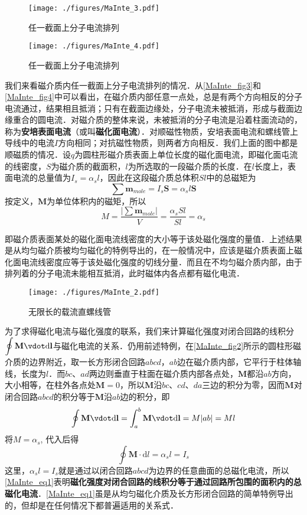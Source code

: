 \begin{figure}[ht]
\centering
\texttt{[image: ./figures/MaInte\_3.pdf]}
\caption{任一截面上分子电流排列} \label{MaInte_fig3}
\end{figure}
\begin{figure}[ht]
\centering
\texttt{[image: ./figures/MaInte\_4.pdf]}
\caption{任一截面上分子电流排列} \label{MaInte_fig4}
\end{figure}
我们来看磁介质内任一截面上分子电流排列的情况．从\autoref{MaInte_fig3}和\autoref{MaInte_fig4}中可以看出，在磁介质内部任意一点处，总是有两个方向相反的分子电流通过，结果相且抵消；只有在截面边缘处，分子电流未被抵消，形成与截面边缘重合的圆电流．对磁介质的整体来说，未被抵消的分子电流是沿着柱面流动的，称为\textbf{安培表面电流}（或叫\textbf{磁化面电流}）．对顺磁性物质，安培表面电流和螺线管上导线中的电流$I$方向相同；对抗磁性物质，则两者方向相反．我们上面的图中都是顺磁质的情况．设$q $为圆柱形磁介质表面上单位长度的磁化面电流，即磁化面屯流的线密度，$ S $为磁介质的截面积，$ l $为所选取的一段磁介质的长度．在$l $长度上，表面电流的总量值为$I_s=\alpha_sl$，因此在这段磁介质总体积$Sl$中的总磁矩为
\begin{equation}
\sum \mathbf{m}_{mole}=I_{s} \mathbf S=\alpha_{s} l \mathbf S
\end{equation}
按定义，$\mathbf  M $为单位体积内的磁矩，所以
\begin{equation}
M=\frac{\left|\sum \mathbf  m_{mole}\right|}{V}=\frac{\alpha_{s} S l}{S l}=\alpha_s
\end{equation}

即磁介质表面某处的磁化面电流线密度的大小等于该处磁化强度的量值．上述结果是从均匀磁介质被均匀磁化的特例导出的，在一般情况中，应该是磁介质表面上磁化面电流线密度应等于该处磁化强度的切线分量．而且在不均匀磁介质内部，由于排列着的分子电流未能相互抵消，此时磁体内各点都有磁化电流．

\begin{figure}[ht]
\centering
\texttt{[image: ./figures/MaInte\_2.pdf]}
\caption{无限长的载流直螺线管} \label{MaInte_fig2}
\end{figure}
为了求得磁化电流与磁化强度的联系，我们来计算磁化强度对闭合回路的线积分$\displaystyle \oint \mathbf M \vdot \mathrm{d} \mathbf l$与磁化电流的关系．仍用前述特例，在\autoref{MaInte_fig2}所示的圆柱形磁介质的边界附近，取一长方形闭合回路$abcd$，$ab $边在磁介质内部，它平行于柱体轴线，长度为$l$．而$bc$、$ad $两边则垂直于柱面在磁介质内部各点处，$\mathbf M$都沿$ab $方向，大小相等，在柱外各点处$\mathbf M=0$，所以$\mathbf M $沿$bc$、$cd$、$da $三边的积分为零，因而$\mathbf M $对闭合回路$abcd$的积分等于$\mathbf M $沿$ab $边的积分，即
\begin{equation}
\oint \mathbf{M}\vdot  \mathrm{d} \mathbf{l}=\int_{a}^{b} \mathbf{M} \vdot  \mathrm{d} \mathbf{l}=M|a b|=M l
\end{equation}
将$M=\alpha_s$, 代入后得
\begin{equation} \label{MaInte_eq1}
\oint \mathbf M \cdot \mathrm{d} l=\alpha_{s} l=I_{s}
\end{equation}
这里，$\alpha_sl=I_s$就是通过以闭合回路$abcd$为边界的任意曲面的总磁化电流，所以\autoref{MaInte_eq1}表明\textbf{磁化强度对闭合回路的线积分等于通过回路所包围的面积内的总磁化电流}．\autoref{MaInte_eq1}虽是从均匀磁化介质及长方形闭合回路的简单特例导出的，但却是在任何情况下都普遍适用的关系式．
